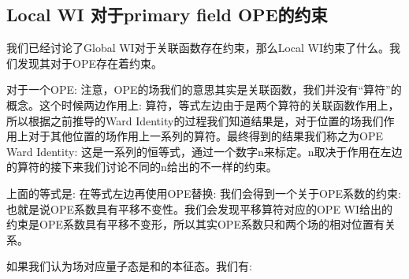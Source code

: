 \subsection{Local WI 对于primary field OPE的约束}

我们已经讨论了Global WI对于关联函数存在约束，那么Local WI约束了什么。我们发现其对于OPE存在着约束。

对于一个OPE:
注意，OPE的场我们的意思其实是关联函数，我们并没有“算符”的概念。这个时候两边作用上:
算符，等式左边由于是两个算符的关联函数作用上，所以根据之前推导的Ward Identity的过程我们知道结果是，对于位置的场我们作用上对于其他位置的场作用上一系列的算符。最终得到的结果我们称之为OPE Ward Identity:
这是一系列的恒等式，通过一个数字n来标定。n取决于作用在左边的算符的接下来我们讨论不同的n给出的不一样的约束。

上面的等式是:
在等式左边再使用OPE替换:
我们会得到一个关于OPE系数的约束:
也就是说OPE系数具有平移不变性。我们会发现平移算符对应的OPE WI给出的约束是OPE系数具有平移不变形，所以其实OPE系数只和两个场的相对位置有关系。

如果我们认为场对应量子态是和的本征态。我们有:

